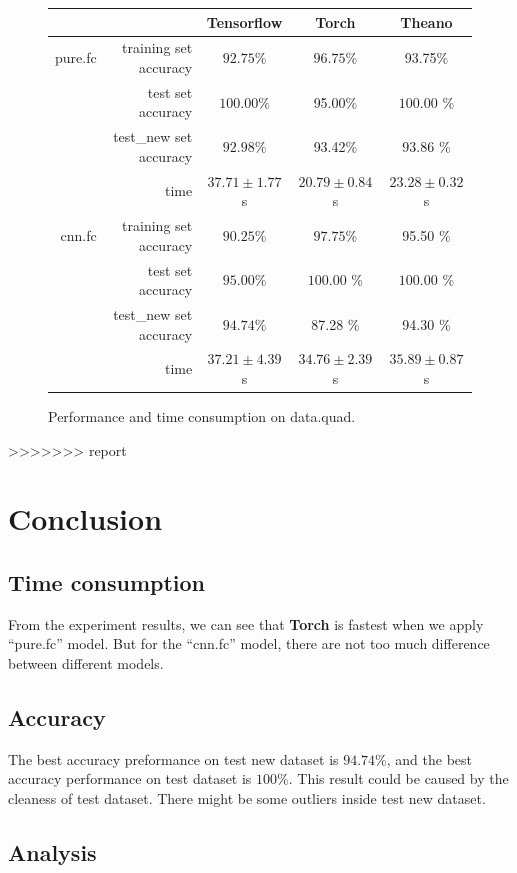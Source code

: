 \documentclass[a4paper]{article}
\begin{document}
\begin{figure}[H]
\centering
\begin{tabular}{|r|r|c|c|c|}
\hline
 & & Tensorflow & Torch & Theano \\
\hline
pure.fc & training set accuracy & $92.75\%$ & $\bm{96.75}$\% & 93.75\% \\
 & test set accuracy & $\bm{100.00}\%$ & 95.00\% & $\bm{100.00}$ \% \\
 & test\_new set accuracy & $92.98\%$ & 93.42\% & $\bm{93.86}$ \% \\
 & time & $37.71\pm1.77$s & $\bm{20.79 \pm 0.84}$ s & $23.28 \pm 0.32$s\\
\hline
cnn.fc & training set accuracy & $90.25\%$ & $\bm{97.75}$\% & 95.50 \% \\
 & test set accuracy & $95.00\%$ & $\bm{100.00}$ \% & $\bm{100.00}$ \% \\
 & test\_new set accuracy & $\bm{94.74}\%$ & 87.28 \% & 94.30 \% \\
 & time & $37.21\pm4.39$s & $\bm{34.76 \pm 2.39}$ s & $ 35.89 \pm 0.87$ s\\
\hline
\end{tabular}
\caption{Performance and time consumption on data.quad.}
\end{figure}
>>>>>>> report

\section{Conclusion}

\subsection{Time consumption}

From the experiment results, we can see that \textbf{Torch} is fastest when we apply ``pure.fc'' model. But for the ``cnn.fc'' model, there are not too much difference between different models.

\subsection{Accuracy}

The best accuracy preformance on test new dataset is $94.74\%$, and the best accuracy performance on test dataset is $100\%$. This result could be caused by the cleaness of test dataset. There might be some outliers inside test new dataset.

\subsection{Analysis}
\end{document}
